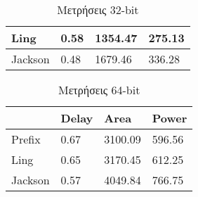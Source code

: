 \begin{multicols}{2}
\begin{table}[H]
\begin{tabular}{||p{1.2cm} | p{0.7cm} p{1cm} p{1cm} ||}
        \hline
        Ling    & 0.58  & 1354.47    & 275.13 \\
        \hline
        Jackson & 0.48  & 1679.46    & 336.28 \\
        \hline
    \end{tabular}
\caption{Μετρήσεις 32-bit}
\label{result_table_32}
\end{table}
\begin{table}[H]
\centering
     \begin{tabular}{||p{1.2cm} | p{0.7cm} p{1cm} p{1cm} ||} 
        \hline
         & Delay & Area & Power \\ [0.5ex] 
        \hline\hline
        Prefix  & 0.67  & 3100.09    & 596.56 \\ 
        \hline
        Ling    & 0.65  & 3170.45    & 612.25 \\
        \hline
        Jackson & 0.57  & 4049.84    & 766.75 \\
        \hline
    \end{tabular}
\caption{Μετρήσεις 64-bit}
\label{result_table_64}
\end{table}
\end{multicols}












